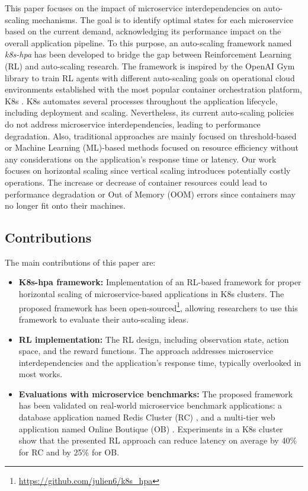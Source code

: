 \documentclass[conference]{IEEEtran}
\begin{document}
This paper focuses on the impact of microservice interdependencies on auto-scaling mechanisms. The goal is to identify optimal states for each microservice based on the current demand, acknowledging its performance impact on the overall application pipeline. To this purpose, an auto-scaling framework named \textit{k8s-hpa} has been developed to bridge the gap between Reinforcement Learning (RL) and auto-scaling research. The framework is inspired by the OpenAI Gym library \cite{dragoni2017microservices} to train RL agents with different auto-scaling goals on operational cloud environments established with the most popular container orchestration platform, K8s \cite{burns2019kubernetes}. K8s automates several processes throughout the application lifecycle, including deployment and scaling. Nevertheless, its current auto-scaling policies do not address microservice interdependencies, leading to performance degradation. Also, traditional approaches are mainly focused on threshold-based or Machine Learning (ML)-based methods focused on resource efficiency without any considerations on the application's response time or latency. Our work focuses on horizontal scaling since vertical scaling introduces potentially costly operations. The increase or decrease of container resources could lead to performance degradation or Out of Memory (OOM) errors since containers may no longer fit onto their machines. 

\subsection*{Contributions}
The main contributions of this paper are:
\begin{itemize}
    \item \textbf{K8s-hpa framework:} Implementation of an RL-based framework for proper horizontal scaling of microservice-based applications in K8s clusters. The proposed framework has been open-sourced\footnote{\url{https://github.com/julien6/k8s_hpa}}, allowing researchers to use this framework to evaluate their auto-scaling ideas.
    \item \textbf{RL implementation:} The RL design, including observation state, action space, and the reward functions. The approach addresses microservice interdependencies and the application's response time, typically overlooked in most works.
    \item \textbf{Evaluations with microservice benchmarks:} The proposed framework has been validated on real-world microservice benchmark applications: a database application named Redis Cluster (RC) \cite{burns2019kubernetes}, and a multi-tier web application named Online Boutique (OB) \cite{burns2019kubernetes}. Experiments in a K8s cluster show that the presented RL approach can reduce latency on average by 40\% for RC and by 25\% for OB.
\end{itemize}
\end{document}
